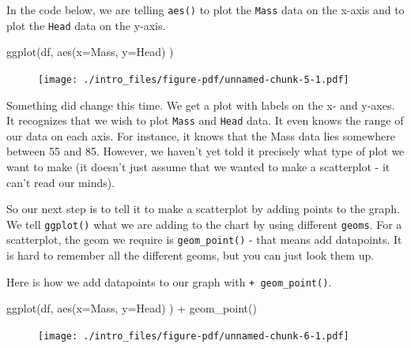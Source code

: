 \documentclass[
  letterpaper,
  DIV=11,
  numbers=noendperiod]{scrreprt}
\newenvironment{Shaded}{\begin{snugshade}}{\end{snugshade}}
\newcommand{\AttributeTok}[1]{\textcolor[rgb]{0.40,0.45,0.13}{#1}}
\newcommand{\FunctionTok}[1]{\textcolor[rgb]{0.28,0.35,0.67}{#1}}
\newcommand{\NormalTok}[1]{\textcolor[rgb]{0.00,0.23,0.31}{#1}}
\newcommand{\SpecialCharTok}[1]{\textcolor[rgb]{0.37,0.37,0.37}{#1}}
\begin{document}
In the code below, we are telling \texttt{aes()} to plot the
\texttt{Mass} data on the x-axis and to plot the \texttt{Head} data on
the y-axis.

\begin{Shaded}
\begin{Highlighting}[]
\FunctionTok{ggplot}\NormalTok{(df, }\FunctionTok{aes}\NormalTok{(}\AttributeTok{x=}\NormalTok{Mass, }\AttributeTok{y=}\NormalTok{Head) )   }
\end{Highlighting}
\end{Shaded}

\begin{figure}[H]

{\centering \texttt{[image: ./intro\_files/figure-pdf/unnamed-chunk-5-1.pdf]}

}

\end{figure}

Something did change this time. We get a plot with labels on the x- and
y-axes. It recognizes that we wish to plot \texttt{Mass} and
\texttt{Head} data. It even knows the range of our data on each axis.
For instance, it knows that the Mass data lies somewhere between 55 and
85. However, we haven't yet told it precisely what type of plot we want
to make (it doesn't just assume that we wanted to make a scatterplot -
it can't read our minds).

So our next step is to tell it to make a scatterplot by adding points to
the graph. We tell \texttt{ggplot()} what we are adding to the chart by
using different \texttt{geoms}. For a scatterplot, the geom we require
is \texttt{geom\_point()} - that means add datapoints. It is hard to
remember all the different geoms, but you can just look them up.

Here is how we add datapoints to our graph with
\texttt{+\ geom\_point()}.

\begin{Shaded}
\begin{Highlighting}[]
\FunctionTok{ggplot}\NormalTok{(df, }\FunctionTok{aes}\NormalTok{(}\AttributeTok{x=}\NormalTok{Mass, }\AttributeTok{y=}\NormalTok{Head) ) }\SpecialCharTok{+} \FunctionTok{geom\_point}\NormalTok{()}
\end{Highlighting}
\end{Shaded}

\begin{figure}[H]

{\centering \texttt{[image: ./intro\_files/figure-pdf/unnamed-chunk-6-1.pdf]}

}

\end{figure}
\end{document}
